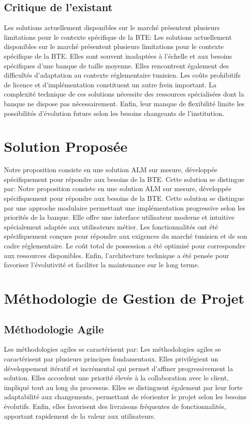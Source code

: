 \documentclass[12pt,a4paper]{report}
\begin{document}
\subsection{Critique de l'existant}
Les solutions actuellement disponibles sur le marché présentent plusieurs limitations pour le contexte spécifique de la BTE:
Les solutions actuellement disponibles sur le marché présentent plusieurs limitations pour le contexte spécifique de la BTE. Elles sont souvent inadaptées à l'échelle et aux besoins spécifiques d'une banque de taille moyenne. Elles rencontrent également des difficultés d'adaptation au contexte réglementaire tunisien. Les coûts prohibitifs de licence et d'implémentation constituent un autre frein important. La complexité technique de ces solutions nécessite des ressources spécialisées dont la banque ne dispose pas nécessairement. Enfin, leur manque de flexibilité limite les possibilités d'évolution future selon les besoins changeants de l'institution.

\section{Solution Proposée}
Notre proposition consiste en une solution ALM sur mesure, développée spécifiquement pour répondre aux besoins de la BTE. Cette solution se distingue par:
Notre proposition consiste en une solution ALM sur mesure, développée spécifiquement pour répondre aux besoins de la BTE. Cette solution se distingue par une approche modulaire permettant une implémentation progressive selon les priorités de la banque. Elle offre une interface utilisateur moderne et intuitive spécialement adaptée aux utilisateurs métier. Les fonctionnalités ont été spécifiquement conçues pour répondre aux exigences du marché tunisien et de son cadre réglementaire. Le coût total de possession a été optimisé pour correspondre aux ressources disponibles. Enfin, l'architecture technique a été pensée pour favoriser l'évolutivité et faciliter la maintenance sur le long terme.

\section{Méthodologie de Gestion de Projet}

\subsection{Méthodologie Agile}
Les méthodologies agiles se caractérisent par:
Les méthodologies agiles se caractérisent par plusieurs principes fondamentaux. Elles privilégient un développement itératif et incrémental qui permet d'affiner progressivement la solution. Elles accordent une priorité élevée à la collaboration avec le client, impliqué tout au long du processus. Elles se distinguent également par leur forte adaptabilité aux changements, permettant de réorienter le projet selon les besoins évolutifs. Enfin, elles favorisent des livraisons fréquentes de fonctionnalités, apportant rapidement de la valeur aux utilisateurs.
\end{document}
